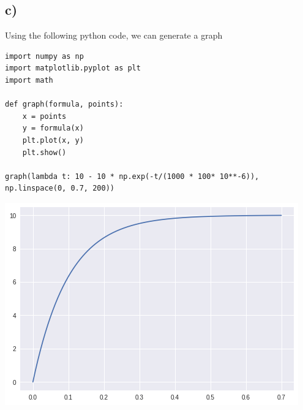 \documentclass{article}
\begin{document}
\subsection*{c)}
Using the following python code, we can generate a graph
\begin{verbatim}
import numpy as np
import matplotlib.pyplot as plt
import math

def graph(formula, points):
    x = points
    y = formula(x)
    plt.plot(x, y)
    plt.show()

graph(lambda t: 10 - 10 * np.exp(-t/(1000 * 100* 10**-6)), np.linspace(0, 0.7, 200))
\end{verbatim}
\includegraphics{plot.png}
\end{document}
